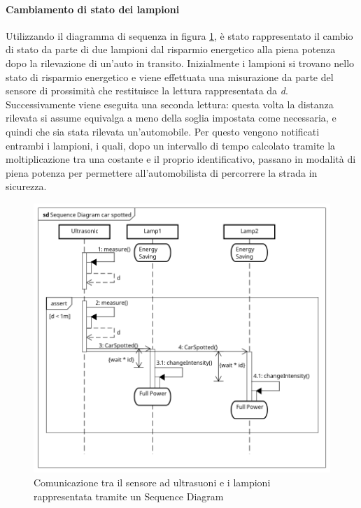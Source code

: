 \paragraph{Cambiamento di stato dei lampioni}
Utilizzando il diagramma di sequenza in figura \ref{SD CAR}, è stato rappresentato il cambio di stato da parte di due lampioni dal risparmio energetico alla piena potenza dopo la rilevazione di un'auto in transito.
Inizialmente i lampioni si trovano nello stato di risparmio energetico e viene effettuata una misurazione da parte del sensore di prossimità che restituisce la lettura rappresentata da \textit{d}.
Successivamente viene eseguita una seconda lettura: questa volta la distanza rilevata si assume equivalga a meno della soglia impostata come necessaria, e quindi che sia stata rilevata un'automobile.
Per questo vengono notificati entrambi i lampioni, i quali, dopo un intervallo di tempo calcolato tramite la moltiplicazione tra una costante e il proprio identificativo, passano in modalità di piena potenza per permettere all'automobilista di percorrere la strada in sicurezza.
\begin{figure}[tbp]
	\centering
	\includegraphics[scale=.59]{figure/Sequence_Diagram_car_spotted.png}
	\caption{Comunicazione tra il sensore ad ultrasuoni e i lampioni rappresentata tramite un Sequence Diagram \label{SD CAR}}
\end{figure}
